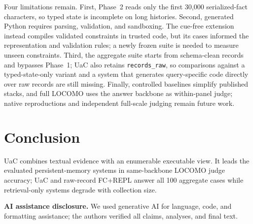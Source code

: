 Four limitations remain. First, Phase~2 reads only the first 30{,}000 serialized-fact characters, so typed state is incomplete on long histories. Second, generated Python requires parsing, validation, and sandboxing. The cue-free extension instead compiles validated constraints in trusted code, but its cases informed the representation and validation rules; a newly frozen suite is needed to measure unseen constraints. Third, the aggregate suite starts from schema-clean records and bypasses Phase~1; UaC also retains \texttt{records\_raw}, so comparisons against a typed-state-only variant and a system that generates query-specific code directly over raw records are still missing. Finally, controlled baselines simplify published stacks, and full LOCOMO uses the answer backbone as within-panel judge; native reproductions and independent full-scale judging remain future work.

\section{Conclusion}

UaC combines textual evidence with an enumerable executable view. It leads the evaluated persistent-memory systems in same-backbone LOCOMO judge accuracy; UaC and raw-record FC+REPL answer all 100 aggregate cases while retrieval-only systems degrade with collection size.

\textbf{AI assistance disclosure.} We used generative AI for language, code, and formatting assistance; the authors verified all claims, analyses, and final text.

